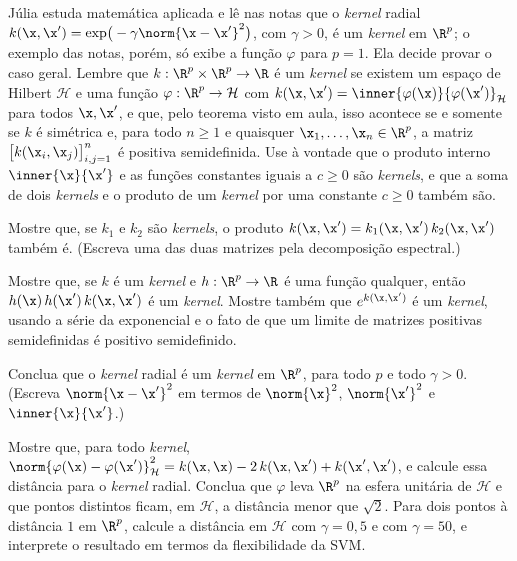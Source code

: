 Júlia estuda matemática aplicada e lê nas notas que o \emph{kernel} radial
$k(\x,\x')=\exp\!\big(-\gamma\norm{\x-\x'}^2\big)$, com $\gamma>0$, é um \emph{kernel} em
$\R^p$; o exemplo das notas, porém, só exibe a função $\varphi$ para $p=1$. Ela decide provar
o caso geral. Lembre que $k:\R^p\times\R^p\to\R$ é um \emph{kernel} se existem um espaço de
Hilbert $\mathcal H$ e uma função $\varphi:\R^p\to\mathcal H$ com
$k(\x,\x')=\inner{\varphi(\x)}{\varphi(\x')}_{\mathcal H}$ para todos $\x,\x'$, e que, pelo
teorema visto em aula, isso acontece se e somente se $k$ é simétrica e, para todo $n\ge1$ e
quaisquer $\x_1,\dots,\x_n\in\R^p$, a matriz $\big[k(\x_i,\x_j)\big]_{i,j=1}^n$ é positiva
semidefinida. Use à vontade que o produto interno $\inner{\x}{\x'}$ e as funções constantes
iguais a $c\ge0$ são \emph{kernels}, e que a soma de dois \emph{kernels} e o produto de um
\emph{kernel} por uma constante $c\ge0$ também são.
\begin{itens}
  \item {} Mostre que, se $k_1$ e $k_2$ são \emph{kernels}, o produto
        $k(\x,\x')=k_1(\x,\x')\,k_2(\x,\x')$ também é. (Escreva uma das duas matrizes pela
        decomposição espectral.)
  \item {} Mostre que, se $k$ é um \emph{kernel} e $h:\R^p\to\R$ é uma função
        qualquer, então $h(\x)\,h(\x')\,k(\x,\x')$ é um \emph{kernel}. Mostre também que
        $e^{k(\x,\x')}$ é um \emph{kernel}, usando a série da exponencial e o fato de que um
        limite de matrizes positivas semidefinidas é positivo semidefinido.
  \item {} Conclua que o \emph{kernel} radial é um \emph{kernel} em $\R^p$, para todo
        $p$ e todo $\gamma>0$. (Escreva $\norm{\x-\x'}^2$ em termos de $\norm{\x}^2$,
        $\norm{\x'}^2$ e $\inner{\x}{\x'}$.)
  \item {} Mostre que, para todo \emph{kernel},
        $\norm{\varphi(\x)-\varphi(\x')}_{\mathcal H}^2=k(\x,\x)-2\,k(\x,\x')+k(\x',\x')$, e
        calcule essa distância para o \emph{kernel} radial. Conclua que $\varphi$ leva $\R^p$
        na esfera unitária de $\mathcal H$ e que pontos distintos ficam, em $\mathcal H$, a
        distância menor que $\sqrt2$. Para dois pontos à distância $1$ em $\R^p$, calcule a
        distância em $\mathcal H$ com $\gamma=0{,}5$ e com $\gamma=50$, e interprete o
        resultado em termos da flexibilidade da SVM.
\end{itens}

